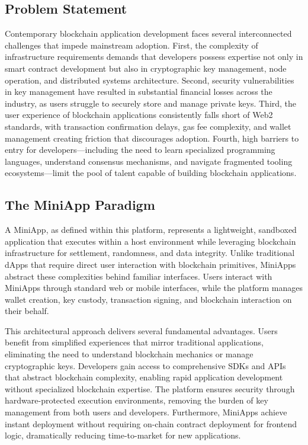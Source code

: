 \documentclass[11pt,a4paper]{article}
\begin{document}
\subsection{Problem Statement}

Contemporary blockchain application development faces several interconnected challenges that impede mainstream adoption. First, the complexity of infrastructure requirements demands that developers possess expertise not only in smart contract development but also in cryptographic key management, node operation, and distributed systems architecture. Second, security vulnerabilities in key management have resulted in substantial financial losses across the industry, as users struggle to securely store and manage private keys. Third, the user experience of blockchain applications consistently falls short of Web2 standards, with transaction confirmation delays, gas fee complexity, and wallet management creating friction that discourages adoption. Fourth, high barriers to entry for developers---including the need to learn specialized programming languages, understand consensus mechanisms, and navigate fragmented tooling ecosystems---limit the pool of talent capable of building blockchain applications.

\subsection{The MiniApp Paradigm}

A MiniApp, as defined within this platform, represents a lightweight, sandboxed application that executes within a host environment while leveraging blockchain infrastructure for settlement, randomness, and data integrity. Unlike traditional dApps that require direct user interaction with blockchain primitives, MiniApps abstract these complexities behind familiar interfaces. Users interact with MiniApps through standard web or mobile interfaces, while the platform manages wallet creation, key custody, transaction signing, and blockchain interaction on their behalf.

This architectural approach delivers several fundamental advantages. Users benefit from simplified experiences that mirror traditional applications, eliminating the need to understand blockchain mechanics or manage cryptographic keys. Developers gain access to comprehensive SDKs and APIs that abstract blockchain complexity, enabling rapid application development without specialized blockchain expertise. The platform ensures security through hardware-protected execution environments, removing the burden of key management from both users and developers. Furthermore, MiniApps achieve instant deployment without requiring on-chain contract deployment for frontend logic, dramatically reducing time-to-market for new applications.
\end{document}
